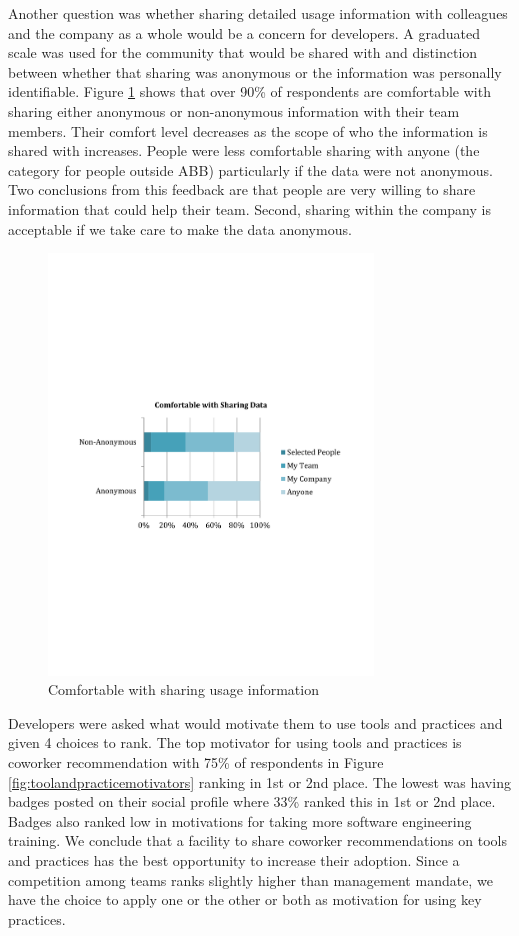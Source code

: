 \documentclass{sig-alternate}
\begin{document}
Another question was whether sharing detailed usage information with colleagues and the company as a whole would be a concern for developers.  A graduated scale was used for the community that would be shared with and distinction between whether that sharing was anonymous or the information was personally identifiable. Figure \ref{fig:comfortwithsharing}  shows that over 90\% of respondents are comfortable with sharing either anonymous or non-anonymous information with their team members. 
Their comfort level decreases as the scope of who the information is shared with increases.  People were less comfortable sharing with anyone (the category for people outside ABB) particularly if the data were not anonymous.  
Two conclusions from this feedback are that people are very willing to share information that could help their team. Second, sharing within the company is acceptable if we take care to make the data anonymous.

\begin{figure}
	\includegraphics[width=3.4in]{ComfortWithSharing.pdf}
	\caption{Comfortable with sharing usage information}
	\label{fig:comfortwithsharing}
\end{figure}

Developers were asked what would motivate them to use tools and practices and given 4 choices to rank.  The top motivator for using tools and practices is coworker recommendation with 75\% of respondents in Figure \ref{fig:toolandpracticemotivators}   ranking in 1st or 2nd place. The lowest was having badges posted on their social profile where 33\% ranked this in 1st or 2nd place.   Badges also ranked low in motivations for taking more software engineering training.  We conclude that a facility to share coworker recommendations on tools and practices has the best opportunity to increase their adoption.  Since a competition among teams ranks slightly higher than management mandate, we have the choice to apply one or the other or both as motivation for using key practices.  
 
\end{document}
